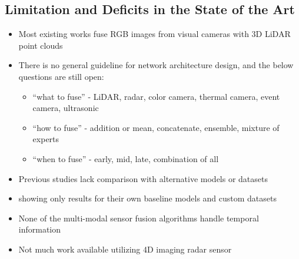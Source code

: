 \documentclass[rnd]{mas_proposal}
\begin{document}
\subsection{Limitation and Deficits in the State of the Art}
\begin{itemize}

    \item Most existing works fuse RGB images from visual cameras with 3D LiDAR point clouds    
    \cite{feng2020deep}
    
    \item There is no general guideline for network architecture design, and the below questions are still open\cite{Zhou2022May}: 
        \begin{itemize}
            \item “what to fuse” - LiDAR, radar, color camera, thermal camera, event camera, ultrasonic 
            \item “how to fuse” - addition or mean, concatenate, ensemble, mixture of experts
            \item “when to fuse” - early, mid, late, combination of all
        \end{itemize}

    \item Previous studies lack comparison with alternative models or datasets
    \item showing only results for their own baseline models and custom datasets
    
    \item None of the multi-modal sensor fusion algorithms handle temporal information
    \cite{bijelic2020seeing}
    
    \item Not much work available utilizing 4D imaging radar sensor 
    \cite{Zhou2022May}    






\end{itemize}
\end{document}
